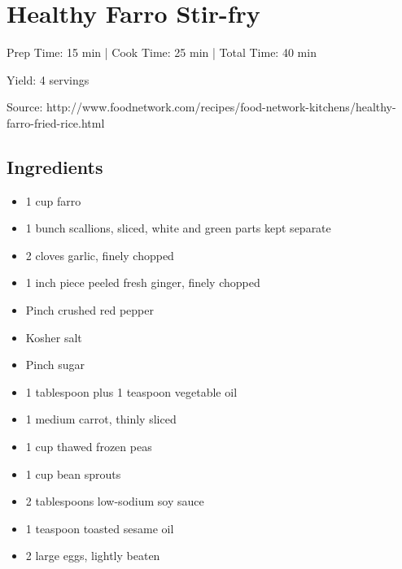 \section{Healthy Farro Stir-fry}

\begin{center}
Prep Time: 15 min |
Cook Time: 25 min |
Total Time: 40 min

\noindent Yield: 4 servings

\vspace{1em}

Source: http://www.foodnetwork.com/recipes/food-network-kitchens/healthy-farro-fried-rice.html 
\end{center}

\subsection{Ingredients}
\begin{multicols}{2}
\begin{itemize}
 \item 1 cup farro
 \item 1 bunch scallions, sliced, white and green parts kept separate
 \item 2 cloves garlic, finely chopped
 \item 1 inch piece peeled fresh ginger, finely chopped
 \item Pinch crushed red pepper
 \item Kosher salt
 \item Pinch sugar
 \item 1 tablespoon plus 1 teaspoon vegetable oil
 \item 1 medium carrot, thinly sliced
 \item 1 cup thawed frozen peas
 \item 1 cup bean sprouts
 \item 2 tablespoons low-sodium soy sauce
 \item 1 teaspoon toasted sesame oil
 \item 2 large eggs, lightly beaten
\end{itemize}
\end{multicols}

